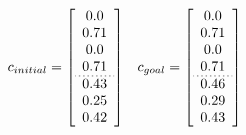 \begin{equation}
  \label{eq:benchmark_pose_vector}
  \centering
  \begin{array}{cc}
    c_{initial}=
    \left[\begin{array}{c}
      0.0 \\
      0.71 \\
      0.0 \\
      0.71\\ \hdashline[1pt/2pt]
      0.43 \\
      0.25 \\
      0.42

    \end{array}\right] &
    c_{goal}=
    \left[\begin{array}{c}
      0.0 \\
      0.71 \\
      0.0 \\
      0.71 \\ \hdashline[1pt/2pt]
      0.46 \\
      0.29 \\
      0.43
    \end{array}\right]
  \end{array}
\end{equation}
